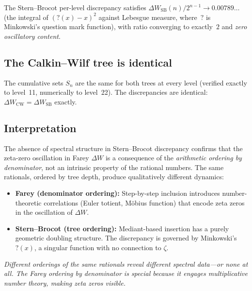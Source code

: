 \documentclass[11pt]{article}
\theoremstyle{definition}
\begin{document}
The Stern--Brocot per-level discrepancy satisfies
$\Delta W_{\mathrm{SB}}(n) / 2^{n-1} \to 0.00789\ldots$
(the integral of $(?(x) - x)^2$ against Lebesgue measure,
where~$?$ is Minkowski's question mark function), with ratio
converging to exactly~$2$ and \emph{zero oscillatory content}.

\subsection{The Calkin--Wilf tree is identical}

The cumulative sets $S_n$ are the same for both trees at every level
(verified exactly to level~11, numerically to level~22).  The
discrepancies are identical:
$\Delta W_{\mathrm{CW}} = \Delta W_{\mathrm{SB}}$ exactly.

\subsection{Interpretation}

The absence of spectral structure in Stern--Brocot discrepancy confirms
that the zeta-zero oscillation in Farey $\Delta W$ is a consequence of
the \emph{arithmetic ordering by denominator}, not an intrinsic property
of the rational numbers.  The same rationals, ordered by tree depth,
produce qualitatively different dynamics:
\begin{itemize}
  \item \textbf{Farey (denominator ordering):} Step-by-step inclusion
    introduces number-theoretic correlations (Euler totient, M\"obius
    function) that encode zeta zeros in the oscillation of $\Delta W$.
  \item \textbf{Stern--Brocot (tree ordering):} Mediant-based insertion
    has a purely geometric doubling structure.  The discrepancy is
    governed by Minkowski's~$?(x)$, a singular function with no
    connection to $\zeta$.
\end{itemize}

\emph{Different orderings of the same rationals reveal different
spectral data---or none at all.  The Farey ordering by denominator is
special because it engages multiplicative number theory, making zeta
zeros visible.}

\end{document}
